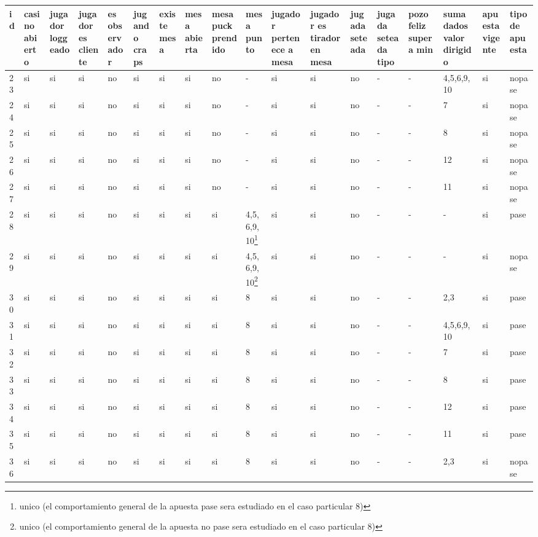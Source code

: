 \documentclass[a4paper, 10pt, notitlepage]{article}
\begin{document}
\begin{landscape}

\begin{tabularx}{1.6\textheight}{|X|X|X|X|X|X|X|X|X|X|X|X|X|X|X|X|X|X|}
\hline
id	&	casino abierto	&	jugador loggeado	& jugador es cliente &	es observador & jugando craps &	existe mesa	&	mesa abierta	&	mesa puck prendido	&	mesa punto	&	jugador pertenece a mesa	&	jugador es tirador en mesa	&	jugada seteada	&	jugada seteada tipo	&	pozo feliz supera min	&	suma dados valor dirigido	&	apuesta vigente	&	tipo de apuesta\\
\hline	
23	&	si	&	si	&	si	&	no	&	si	&	si	&	si	&	no	&	-	&	si	&	si	&	no	&	-	&	-	&	4,5,6,9,10	&	si	&	nopase\\
24	&	si	&	si	&	si	&	no	&	si	&	si	&	si	&	no	&	-	&	si	&	si	&	no	&	-	&	-	&	7	&	si	&	nopase\\
25	&	si	&	si	&	si	&	no	&	si	&	si	&	si	&	no	&	-	&	si	&	si	&	no	&	-	&	-	&	8	&	si	&	nopase\\
26	&	si	&	si	&	si	&	no	&	si	&	si	&	si	&	no	&	-	&	si	&	si	&	no	&	-	&	-	&	12	&	si	&	nopase\\
27	&	si	&	si	&	si	&	no	&	si	&	si	&	si	&	no	&	-	&	si	&	si	&	no	&	-	&	-	&	11	&	si	&	nopase\\
28	&	si	&	si	&	si	&	no	&	si	&	si	&	si	&	si	&	4,5,6,9,10\footnote{unico (el comportamiento general de la apuesta pase sera estudiado en el caso particular 8)}	&	si	&	si	&	no	&	-	&	-	&	-	&	si	&	pase\\
29	&	si	&	si	&	si	&	no	&	si	&	si	&	si	&	si	&	4,5,6,9,10\footnote{unico (el comportamiento general de la apuesta no pase sera estudiado en el caso particular 8)}	&	si	&	si	&	no	&	-	&	-	&	-	&	si	&	nopase\\
30	&	si	&	si	&	si	&	no	&	si	&	si	&	si	&	si	&	8	&	si	&	si	&	no	&	-	&	-	&	2,3	&	si	&	pase\\
31	&	si	&	si	&	si	&	no	&	si	&	si	&	si	&	si	&	8	&	si	&	si	&	no	&	-	&	-	&	4,5,6,9,10	&	si	&	pase\\
32	&	si	&	si	&	si	&	no	&	si	&	si	&	si	&	si	&	8	&	si	&	si	&	no	&	-	&	-	&	7	&	si	&	pase\\
33	&	si	&	si	&	si	&	no	&	si	&	si	&	si	&	si	&	8	&	si	&	si	&	no	&	-	&	-	&	8	&	si	&	pase\\
34	&	si	&	si	&	si	&	no	&	si	&	si	&	si	&	si	&	8	&	si	&	si	&	no	&	-	&	-	&	12	&	si	&	pase\\
35	&	si	&	si	&	si	&	no	&	si	&	si	&	si	&	si	&	8	&	si	&	si	&	no	&	-	&	-	&	11	&	si	&	pase\\
36	&	si	&	si	&	si	&	no	&	si	&	si	&	si	&	si	&	8	&	si	&	si	&	no	&	-	&	-	&	2,3	&	si	&	nopase\\

\end{tabularx}
\end{landscape}
\end{document}
